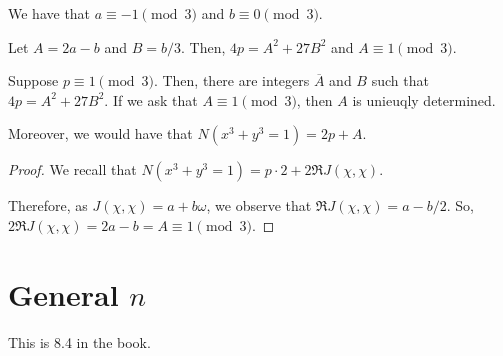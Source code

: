 \documentclass{article}
\begin{document}
\begin{proposition}
	We have that $a \equiv -1 \pmod 3$ and $b \equiv 0 \pmod 3$.
\end{proposition}

\begin{proposition}
	Let $A = 2a - b$ and $B = b / 3$. Then, $4p = A^2 + 27B^2$ and $A \equiv 1 \pmod 3$.
\end{proposition}

\begin{theorem}
	Suppose $p \equiv 1 \pmod 3$. Then, there are integers $\overline{A}$ and $B$ such that $4p = A^2 + 27B^2$. If we ask that $A \equiv 1 \pmod 3$, then $A$ is unieuqly determined.

Moreover, we would have that $N(x^3 + y^3 = 1) = 2p + A$.
\end{theorem}

\begin{proof}
	We recall that $N(x^3 + y^3 = 1) = p \cdot 2 + 2 \Re J(\chi, \chi)$.

	Therefore, as $J(\chi, \chi) = a + b\omega$, we observe that $\Re J(\chi, \chi) = a - b/2$. So, $2 \Re J(\chi, \chi) = 2a - b = A \equiv 1 \pmod 3$.
\end{proof}

\section{General $n$}
This is 8.4 in the book.
\end{document}
